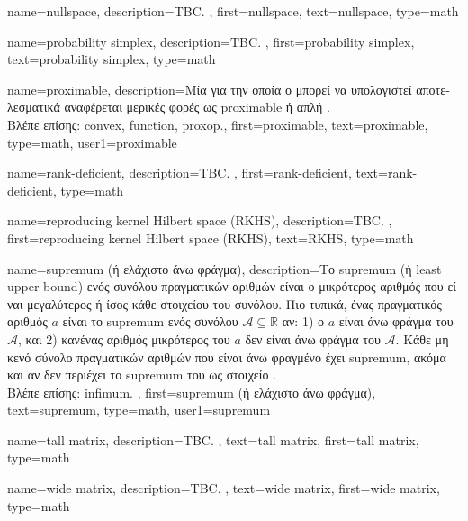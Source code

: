 {name={nullspace},
	description={TBC. },
 	first={nullspace},
 	text={nullspace},
	type=math
}

{name={probability simplex},
	description={TBC. },
  	first={probability simplex},
  	text={probability simplex},
	type=math
}

{name={proximable},
	description={\foreignlanguage{greek}{Μία} 
		  \foreignlanguage{greek}{για την οποία ο}  
		\foreignlanguage{greek}{μπορεί να υπολογιστεί αποτελεσματικά αναφέρεται μερικές φορές ως} 
		proximable \foreignlanguage{greek}{ή απλή} \cite{Condat2013}.
		\\
		\foreignlanguage{greek}{Βλέπε επίσης:} \gls{convex}, \gls{function}, \gls{proxop}.},
	first={proximable},
	text={proximable},
	type=math,
	user1={proximable}
}%

{name={rank-deficient},
	description={TBC. }, 
	first={rank-deficient},
   	text={rank-deficient},
	type=math
}

{name={reproducing kernel Hilbert space (RKHS)},
	description={TBC. }, 
 	first={reproducing kernel Hilbert space (RKHS)},
 	text={RKHS},
	type=math
}

{name={supremum \foreignlanguage{greek}{(ή ελάχιστο άνω φράγμα)}},
	description={\foreignlanguage{greek}{Το} supremum 
		(\foreignlanguage{greek}{ή} least upper bound) \foreignlanguage{greek}{ενός συνόλου πραγματικών αριθμών είναι ο μικρότερος αριθμός 
		που είναι μεγαλύτερος ή ίσος κάθε στοιχείου του συνόλου. Πιο τυπικά, ένας πραγματικός αριθμός $a$ είναι το} supremum 
		\foreignlanguage{greek}{ενός συνόλου $\mathcal{A} \subseteq \mathbb{R}$ αν: 1) ο $a$ είναι άνω φράγμα του $\mathcal{A}$, και 
		2) κανένας αριθμός μικρότερος του $a$ δεν είναι άνω φράγμα του $\mathcal{A}$. Κάθε μη κενό σύνολο πραγματικών 
		αριθμών που είναι άνω φραγμένο έχει} supremum, \foreignlanguage{greek}{ακόμα και αν δεν περιέχει το} supremum 
		\foreignlanguage{greek}{του ως στοιχείο} \cite[\foreignlanguage{greek}{Ενότητα}~1.4]{RudinBookPrinciplesMatheAnalysis}.
		\\
		 \foreignlanguage{greek}{Βλέπε επίσης:} \gls{infimum}. },
	first={supremum \foreignlanguage{greek}{(ή ελάχιστο άνω φράγμα)}},
	text={supremum},
	type=math,
	user1={supremum}
}

{name={tall matrix},
	description={TBC. },
	text={tall matrix},
   	first={tall matrix},
	type=math
}

{name={wide matrix},
	description={TBC. },
	text={wide matrix},
   	first={wide matrix},
	type=math
}